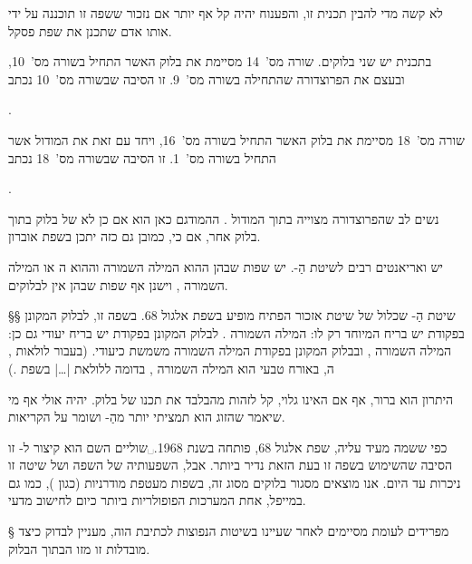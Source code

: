     לא קשה מדי להבין תכנית זו, והפענוח יהיה קל אף יותר אם נזכור ששפה זו תוכננה על
    ידי אותו אדם שתכנן את שפת פסקל.

    בתכנית יש שני בלוקים. שורה מס'~14 מסיימת את בלוק ה אשר התחיל בשורה
    מס'~10, ובעצם את הפרוצדורה  שהתחילה בשורה מס'~9.
    זו הסיבה שבשורה מס'~10 נכתב
    \begin{קוד}
    .
    \end{קוד}

    שורה מס'~18 מסיימת את בלוק ה אשר התחיל בשורה מס'~16, ויחד עם זאת את
    המודול  אשר התחיל בשורה מס'~1. זו הסיבה שבשורה מס'~18 נכתב
    \begin{קוד}
    .
    \end{קוד}

    נשים לב שהפרוצדורה  מצוייה בתוך המודול . ה המודגם
    כאן הוא אם כן לא של בלוק  בתוך בלוק  אחר, אם כי, כמובן גם 
כזה יתכן בשפת אוברון.

יש ואריאנטים רבים לשיטת הַ-.
יש שפות שבהן ה הוא המילה השמורה  וה הוא
ה  או
 המילה השמורה , וישנן אף שפות שבהן
אין  לבלוקים.

§§ שיטת הַ-
שכלול של שיטת אזכור הפתיח מופיע בשפת אלגול 68. בשפה זו, לבלוק המקונן בפקודת
 יש בריח המיוחד רק לו: המילה השמורה . לבלוק  המקונן בפקודת
 יש בריח יעודי גם כן: המילה השמורה , ובבלוק המקונן בפקודת
 המילה השמורה  משמשת כ יעודי. (בעבור לולאות
, ה, באורח טבעי הוא המילה השמורה
, בדומה ללולאת \E|…| בשפת .)

היתרון הוא ברור, אף אם ה אינו גלוי, קל לזהות מה בלבד
את תכנו של בלוק. יהיה אולי אף מי שיאמר שהזוג  הוא תמציתי יותר
מהַ- ושומר על הקריאות.

כפי ששמה מעיד עליה, שפת אלגול 68, פותחה בשנת 1968.␣שוליים{
  השם  הוא קיצור ל-}
זו הסיבה שהשימוש בשפה זו בעת הזאת נדיר ביותר. אבל, השפעותיה של השפה ושל שיטה
זו ניכרות עד היום. אנו מוצאים מסגור בלוקים מסוג זה, בשפות מעטפת מודרניות (כגון
), כמו גם במייפל, אחת המערכות הפופולריות ביותר כיום לחישוב מדעי.

§ מפרידים לעומת מסיימים
לאחר שעיינו בשיטות הנפוצות לכתיבת ה וה, מעניין לבדוק כיצד מובדלות
זו מזו ה בתוך הבלוק.

